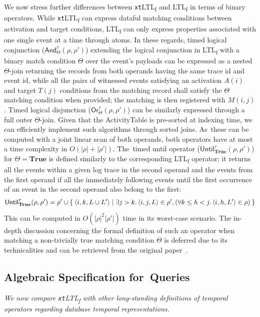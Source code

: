 \documentclass[information,article,accept,pdftex,oneauthor]{Definitions/mdpi}
\begin{document}
We now stress further differences between \texttt{xt}LTL\textsubscript{f} and LTL\textsubscript{f} in terms of binary operators. While \texttt{xt}LTL\textsubscript{f} can  express dataful matching conditions between activation and target conditions,  LTL\textsubscript{f} can only express properties associated with one single event at a time through atoms.
In these regards, timed logical conjunction ($\textsf{And}^\tau_\Theta(\rho,\rho')$) extending the logical conjunction in LTL\textsubscript{f} with a binary match condition $\Theta$ over the event's payloads can be expressed as a nested $\Theta$-join returning the records from both operands having the same trace id and event id, while all the pairs of witnessed events satisfying an activation $A(i)$ and target $T(j)$ conditions from the matching record shall satisfy the $\Theta$ matching condition when provided; the matching is then registered with $M(i,j)$. Timed logical disjunction ($\textsf{Or}^\tau_\Theta(\rho,\rho')$) can be similarly expressed through a full outer $\Theta$-join. Given that the ActivityTable is pre-sorted at indexing time, we can efficiently implement such algorithms through sorted joins. As~these can be computed with a joint linear scan of both operands, both operators have at most a time complexity in $O(|\rho|+|\rho'|)$. The~timed until operator ($\textsf{Until}^\tau_{\textbf{True}}(\rho,\rho')$) {for} %
 $\Theta=\textbf{True}$ is defined similarly to the corresponding LTL\textsubscript{f} operator; it returns all the events within a given log trace in the second operand and the events from the first operand if all the immediately following events until the first occurrence of an event in the second operand also belong to the first:
		\[\begin{split}
 			\textsf{Until}^\tau_\textbf{True}(\rho,\rho')=\rho'\cup \Set{\langle i,k,L\cup L'\rangle |\exists j>k. \braket{i,j,L}\in\rho', 
(\forall k\leq h<j. \braket{i,h,L'}\in\rho) }
\end{split}\]
This can be computed in $O(|\rho|^2|\rho'|)$ time in its worst-case scenario.
 The in-depth discussion concerning the formal definition of such an operator when matching a non-trivially true matching condition $\Theta$ is deferred due to its technicalities and can be retrieved from the original paper~\cite{info14030173}.


\subsection{Algebraic Specification for~Queries}\label{timecompl}
\textit{We now compare \texttt{xt}LTL\textsubscript{f} with other long-standing definitions of temporal operators regarding database temporal representations.} 
\end{document}
